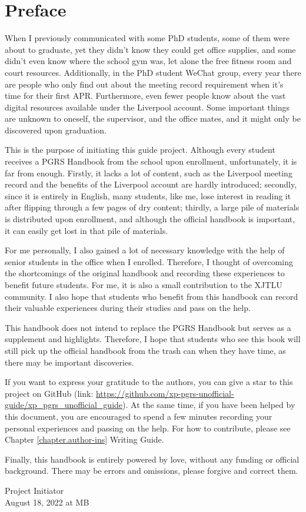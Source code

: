 \chapter{Preface}
\thispagestyle{empty}
When I previously communicated with some PhD students, some of them were about to graduate, yet they didn't know they could get office supplies, and some didn't even know where the school gym was, let alone the free fitness room and court resources. Additionally, in the PhD student WeChat group, every year there are people who only find out about the meeting record requirement when it's time for their first APR. Furthermore, even fewer people know about the vast digital resources available under the Liverpool account. Some important things are unknown to oneself, the supervisor, and the office mates, and it might only be discovered upon graduation.

This is the purpose of initiating this guide project. Although every student receives a PGRS Handbook from the school upon enrollment, unfortunately, it is far from enough. Firstly, it lacks a lot of content, such as the Liverpool meeting record and the benefits of the Liverpool account are hardly introduced; secondly, since it is entirely in English, many students, like me, lose interest in reading it after flipping through a few pages of dry content; thirdly, a large pile of materials is distributed upon enrollment, and although the official handbook is important, it can easily get lost in that pile of materials.

For me personally, I also gained a lot of necessary knowledge with the help of senior students in the office when I enrolled. Therefore, I thought of overcoming the shortcomings of the original handbook and recording these experiences to benefit future students. For me, it is also a small contribution to the XJTLU community. I also hope that students who benefit from this handbook can record their valuable experiences during their studies and pass on the help.

This handbook does not intend to replace the PGRS Handbook but serves as a supplement and highlights. Therefore, I hope that students who see this book will still pick up the official handbook from the trash can when they have time, as there may be important discoveries.

If you want to express your gratitude to the authors, you can give a star to this project on GitHub (link: \url{https://github.com/xp-pgrs-unofficial-guide/xp_pgrs_unofficial_guide}). At the same time, if you have been helped by this document, you are encouraged to spend a few minutes recording your personal experiences and passing on the help. For how to contribute, please see Chapter \ref{chapter.author-ins} Writing Guide.

Finally, this handbook is entirely powered by love, without any funding or official background. There may be errors and omissions, please forgive and correct them.

\begin{flushright}
Project Initiator \KW\\
August 18, 2022 at MB
\end{flushright}


